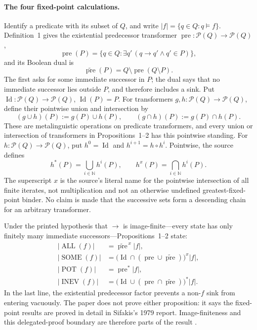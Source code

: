 \paragraph{The four fixed-point calculations.}
Identify a predicate with its subset of \(Q\), and write
\(\lvert f\rvert=\{q\in Q:q\models f\}\).  Definition~1 gives the
existential predecessor transformer
\(\operatorname{pre}:\mathcal P(Q)\to\mathcal P(Q)\),
\[
 \operatorname{pre}(P)
 =\{q\in Q:\exists q'\,(q\to q'\land q'\in P)\},
\]
and its Boolean dual is
\[
 \widetilde{\operatorname{pre}}(P)
 =Q\setminus\operatorname{pre}(Q\setminus P).
\]
The first asks for some immediate successor in \(P\); the dual says that no
immediate successor lies outside \(P\), and therefore includes a sink.  Put
\(\operatorname{Id}:\mathcal P(Q)\to\mathcal P(Q)\),
\(\operatorname{Id}(P)=P\).  For transformers
\(g,h:\mathcal P(Q)\to\mathcal P(Q)\), define their pointwise union and
intersection by
\[
 (g\cup h)(P):=g(P)\cup h(P),
 \qquad
 (g\cap h)(P):=g(P)\cap h(P).
\]
These are metalinguistic operations on predicate transformers, and every
union or intersection of transformers in Propositions~1--2 has this pointwise
standing.  For
\(h:\mathcal P(Q)\to\mathcal P(Q)\), put \(h^0=\operatorname{Id}\) and
\(h^{i+1}=h\circ h^i\).  Pointwise, the source defines
\[
 h^*(P)=\bigcup_{i\in\mathbb N}h^i(P),
 \qquad
 h^x(P)=\bigcap_{i\in\mathbb N}h^i(P).
\]
The superscript \(x\) is the source's literal name for the pointwise
intersection of all finite iterates, not multiplication and not an otherwise
undefined greatest-fixed-point binder.  No claim is made that the successive
sets form a descending chain for an arbitrary transformer.

Under the printed hypothesis that \(\to\) is image-finite---every state has
only finitely many immediate successors---Propositions~1--2 state:
\[
\begin{aligned}
\lvert\operatorname{ALL}(f)\rvert
 &=\widetilde{\operatorname{pre}}^{\,x}\lvert f\rvert,\\
\lvert\operatorname{SOME}(f)\rvert
 &=\bigl(\operatorname{Id}\cap
   (\operatorname{pre}\cup\widetilde{\operatorname{pre}})\bigr)^x
   \lvert f\rvert,\\
\lvert\operatorname{POT}(f)\rvert
 &=\operatorname{pre}^*\lvert f\rvert,\\
\lvert\operatorname{INEV}(f)\rvert
 &=\bigl(\operatorname{Id}\cup
   (\operatorname{pre}\cap\widetilde{\operatorname{pre}})\bigr)^*
   \lvert f\rvert.
\end{aligned}
\]
In the last line, the existential predecessor factor prevents a non-\(f\)
sink from entering vacuously.  The paper does not prove either proposition:
it says the fixed-point results are proved in detail in Sifakis's 1979 report.
Image-finiteness and this delegated-proof boundary are therefore parts of the
result \cite[pp.~347--348]{QueilleSifakis1982}.


